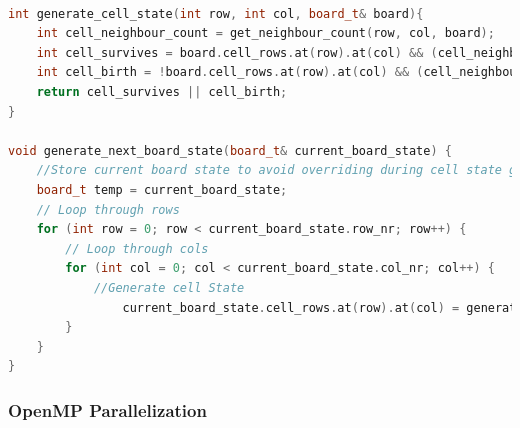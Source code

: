 \documentclass[a4paper,english,12pt,twoside=false]{scrartcl} %
\begin{document}
\begin{lstlisting}[caption={Naive State Generation Algorithm},label={lst:gol-naive-generation-algorithm},language=C++]

int generate_cell_state(int row, int col, board_t& board){
    int cell_neighbour_count = get_neighbour_count(row, col, board);
    int cell_survives = board.cell_rows.at(row).at(col) && (cell_neighbour_count == 2 || cell_neighbour_count == 3);
    int cell_birth = !board.cell_rows.at(row).at(col) && (cell_neighbour_count == 3);
    return cell_survives || cell_birth;
}

void generate_next_board_state(board_t& current_board_state) {
    //Store current board state to avoid overriding during cell state generation
    board_t temp = current_board_state;
    // Loop through rows
    for (int row = 0; row < current_board_state.row_nr; row++) {
        // Loop through cols
        for (int col = 0; col < current_board_state.col_nr; col++) {
        	//Generate cell State
        		current_board_state.cell_rows.at(row).at(col) = generate_cell_state(row, col, temp);
        }
    }
}
\end{lstlisting}


\subsubsection{OpenMP Parallelization}
\end{document}
